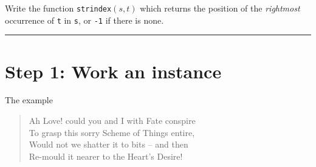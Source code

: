 \documentclass{article}
\begin{document}
Write the function \texttt{strindex\((s,t)\)} which returns the position of the
\textit{rightmost} occurrence of \texttt{t} in \texttt{s}, or \texttt{-1}
if there is none.
\vspace{2cm} \hrule
\section*{Step 1: Work an instance}
The example
\begin{quote}
  Ah Love! could you and I with Fate conspire\\
  To grasp this sorry Scheme of Things entire,\\
  Would not we shatter it to bits -- and then\\
  Re-mould it nearer to the Heart's Desire!
\end{quote}
\end{document}
